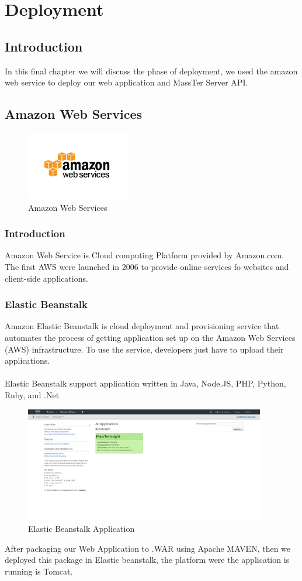\chapter{Deployment}

	\section{Introduction}
	In this final chapter we will discuss the phase of deployment, we used the amazon web service to deploy our web application and MassTer Server API.
	\section{Amazon Web Services}
	\begin{figure}[h]
		\centering
		\includegraphics[width=0.4\textwidth]{aws-logo.png}
		\caption{Amazon Web Services}
	\end{figure}
	\subsection{Introduction}
	Amazon Web Service is Cloud computing Platform provided by Amazon.com. The first AWS were launched in 2006 to provide online services fo websites and client-side applications.
	\clearpage
	\newpage
	\subsection{Elastic Beanstalk}
	Amazon Elastic Beanstalk is cloud deployment and provisioning service that automates the process of getting application set up on the Amazon Web Services (AWS) infrastructure. To use the service, developers just have to upload their applications.
	\\
	\\
	Elastic Beanstalk support application written in Java, Node.JS, PHP, Python, Ruby, and .Net
	
	\begin{figure}[h]
		\centering
		\includegraphics[angle=90,width=10.5cm]{ElasticBeanstalkApplication.png}
		\caption{Elastic Beanstalk Application}	
	\end{figure}
After packaging our Web Application to .WAR using Apache MAVEN, then we deployed this package in Elastic beanstalk, the platform were the application is running is Tomcat.

